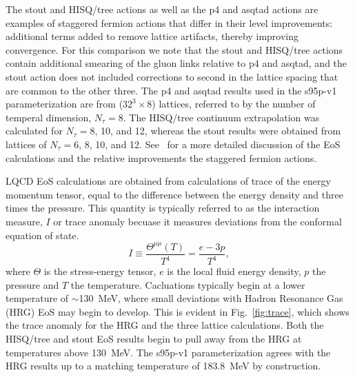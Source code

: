 \documentclass[aps,prc,reprint,amsmath,nofootinbib,superscriptaddress]{revtex4-1}
\begin{document}
The stout and HISQ/tree actions as well as the p4 and asqtad actions are examples of staggered fermion actions that differ in their level improvements: 
additional terms added to remove lattice artifacts, thereby improving convergence.  For this comparison we note that the stout and HISQ/tree actions 
contain additional smearing of the gluon links relative to p4 and asqtad, and the stout action does not included corrections to second in the lattice spacing 
that are common to the other three.  The p4 and asqtad results used in the s95p-v1 parameterization are from ($32^3 \times 8$) lattices, referred to by 
the number of temperal dimension, $N_{\tau}=8$.  The HISQ/tree continuum extrapolation was calculated for $N_{\tau}=8$, 10, and 12, whereas the stout 
results were obtained from lattices of $N_{\tau}=6$, 8, 10, and 12.   See~\cite{Soltz:2015ur_arxiv1502.02296} for a more detailed discussion of the EoS calculations and
the relative improvements the staggered fermion actions.

LQCD EoS calculations are obtained from calculations of trace of the energy momentum tensor, equal to the difference between the energy density
and three times the pressure.  This quantity is typically referred to as the interaction measure, $I$ or trace anomaly becuase it measures deviations from the conformal equation
of state.  
\begin{equation}
 I \equiv \frac{\Theta^{\mu\mu}(T)}{T^4} = \frac{e - 3p}{T^4},
\end{equation}
%
where $\Theta$ is the stress-energy tensor, $e$ is the local fluid energy density, $p$ the pressure and $T$ the temperature.
Cacluations typically begin at a lower temperature of $\sim$130~MeV, where small deviations with Hadron Resonance Gas (HRG) EoS may begin
to develop.  This is evident in Fig.~\ref{fig:trace}, which shows the trace anomaly for the HRG and the three lattice calculations.  Both the HISQ/tree and stout
EoS results begin to pull away from the HRG at temperatures above 130~MeV.  The s95p-v1 parameterization agrees with the HRG results up to a matching
temperature of 183.8~MeV by construction.
\end{document}
